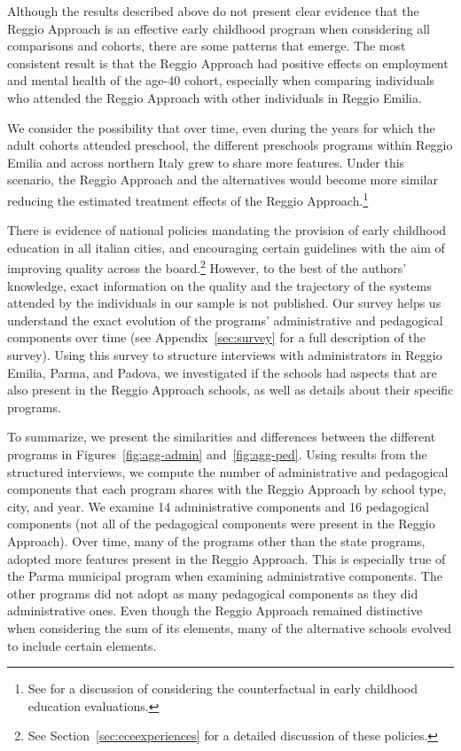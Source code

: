 Although the results described above do not present clear evidence that the Reggio Approach is an effective early childhood program when considering all comparisons and cohorts, there are some patterns that emerge. The most consistent result is that the Reggio Approach had positive effects on employment and mental health of the age-40 cohort, especially when comparing individuals who attended the Reggio Approach with other individuals in Reggio Emilia.

We consider the possibility that over time, even during the years for which the adult cohorts attended preschool, the different preschools programs within Reggio Emilia and across northern Italy grew to share more features. Under this scenario, the Reggio Approach and the alternatives would become more similar reducing the estimated treatment effects of the Reggio Approach.\footnote{See \citet{Elango_Hojman_etal_2016_Early-Edu} for a discussion of considering the counterfactual in early childhood education evaluations.} 

There is evidence of national policies mandating the provision of early childhood education in all italian cities, and encouraging certain guidelines with the aim of improving quality across the board.\footnote{See Section~\ref{sec:eceexperiences} for a detailed discussion of these policies.} However, to the best of the authors' knowledge, exact information on the quality and the trajectory of the systems attended by the individuals in our sample is not published. Our survey helps us understand the exact evolution of the programs' administrative and pedagogical components over time (see Appendix~\ref{sec:survey} for a full description of the survey). Using this survey to structure interviews with administrators in Reggio Emilia, Parma, and Padova, we investigated if the schools had aspects that are also present in the Reggio Approach schools, as well as details about their specific programs. 

To summarize, we present the similarities and differences between the different programs in Figures~\ref{fig:agg-admin} and~\ref{fig:agg-ped}. Using results from the structured interviews, we compute the number of administrative and pedagogical components that each program shares with the Reggio Approach by school type, city, and year. We examine 14 administrative components and 16 pedagogical components (not all of the pedagogical components were present in the Reggio Approach). Over time, many of the programs other than the state programs, adopted more features present in the Reggio Approach. This is especially true of the Parma municipal program when examining administrative components. The other programs did not adopt as many pedagogical components as they did administrative ones. Even though the Reggio Approach remained distinctive when considering the sum of its elements, many of the alternative schools evolved to include certain elements.

